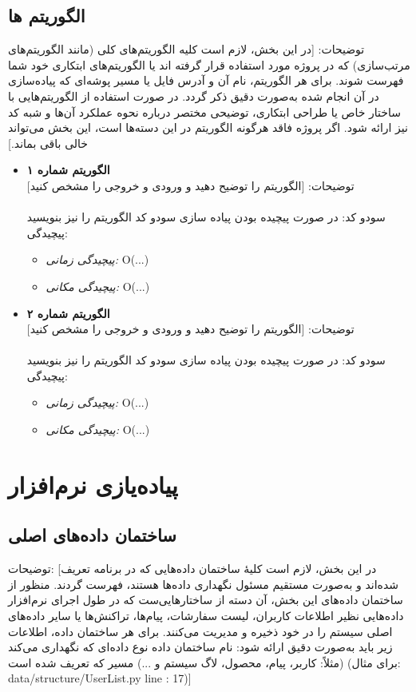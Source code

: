 \documentclass[12pt]{article}
\begin{document}
\subsection{الگوریتم ها}
	توضیحات: [در این بخش، لازم است کلیه الگوریتم‌های کلی (مانند الگوریتم‌های مرتب‌سازی) که در پروژه مورد استفاده قرار گرفته اند یا  الگوریتم‌های ابتکاری خود شما فهرست شوند. برای هر الگوریتم، نام آن و آدرس فایل یا مسیر پوشه‌ای که پیاده‌سازی در آن انجام شده به‌صورت دقیق ذکر گردد. در صورت استفاده از الگوریتم‌هایی با ساختار خاص یا طراحی ابتکاری، توضیحی مختصر درباره نحوه عملکرد آن‌ها و شبه کد نیز ارائه شود. اگر پروژه فاقد هرگونه الگوریتم در این دسته‌ها است، این بخش می‌تواند خالی باقی بماند.]
\begin{itemize}[noitemsep]
	\item \textbf{الگوریتم شماره ۱}\\
	توضیحات: [الگوریتم را توضیح دهید و ورودی و خروجی را مشخص کنید]\\
	\lipsum[9]
	\\[0.2cm]
	سودو کد:
	در صورت پیچیده بودن پیاده سازی سودو کد الگوریتم را نیز بنویسید\\[0.2cm]
	پیچیدگی:
	\begin{itemize}[noitemsep]
		\item \textit{پیچیدگی زمانی:} O(...)
		\item \textit{پیچیدگی مکانی:} O(...)
	\end{itemize}		
	\item \textbf{الگوریتم شماره ۲}\\
	توضیحات: [الگوریتم را توضیح دهید و ورودی و خروجی را مشخص کنید]\\
	\lipsum[9]
	\\[0.2cm]
	سودو کد:
	در صورت پیچیده بودن پیاده سازی سودو کد الگوریتم را نیز بنویسید\\[0.2cm]
	پیچیدگی:
	\begin{itemize}[noitemsep]
		\item \textit{پیچیدگی زمانی:} O(...)
		\item \textit{پیچیدگی مکانی:} O(...)
	\end{itemize}
\end{itemize}

\newpage
\section{ پیاده‌یازی نرم‌افزار}
\subsection{ساختمان داده‌های اصلی }
	توضیحات: [در این بخش، لازم است کلیهٔ ساختمان داده‌هایی که در برنامه تعریف شده‌اند و به‌صورت مستقیم مسئول نگهداری داده‌ها هستند، فهرست گردند. منظور از ساختمان داده‌های این بخش، آن دسته از ساختارهایی‌ست که در طول اجرای نرم‌افزار داده‌هایی نظیر اطلاعات کاربران، لیست سفارشات، پیام‌ها، تراکنش‌ها یا سایر داده‌های اصلی سیستم را در خود ذخیره و مدیریت می‌کنند.
برای هر ساختمان داده، اطلاعات زیر باید به‌صورت دقیق ارائه شود:
نام ساختمان داده
نوع داده‌ای که نگهداری می‌کند (مثلاً: کاربر، پیام، محصول، لاگ سیستم و ...)
مسیر که تعریف شده است (برای مثال: data/structure/UserList.py
line : 17)]\\
\end{document}
